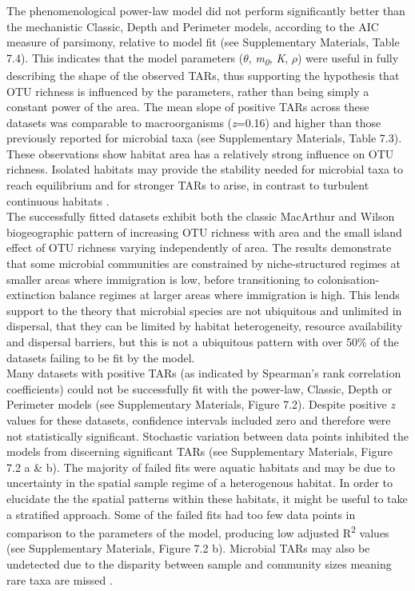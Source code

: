 \noindent The phenomenological power-law model did not perform significantly better than the mechanistic Classic, Depth and Perimeter models, according to the AIC measure of parsimony, relative to model fit (see Supplementary Materials, Table 7.4). This indicates that the model parameters ($\theta$, \textit{m\textsubscript{0}}, \textit{K}, $\rho$) were useful in fully describing the shape of the observed TARs, thus supporting the hypothesis that OTU richness is influenced by the parameters, rather than being simply a constant power of the area. The mean slope of positive TARs across these datasets was comparable to macroorganisms (\textit{z}=0.16) and higher than those previously reported for microbial taxa \cite{rosenzweig1995species} \cite{green2004spatial} (see Supplementary Materials, Table 7.3). These observations show habitat area has a relatively strong influence on OTU richness. Isolated habitats may provide the stability needed for microbial taxa to reach equilibrium and for stronger TARs to arise, in contrast to turbulent continuous habitats \cite{bell2005larger}.    \\

\noindent The successfully fitted datasets exhibit both the classic MacArthur and Wilson \cite{MacArthurRobertH1967Ttoi} biogeographic pattern of increasing OTU richness with area and the small island effect of OTU richness varying independently of area. The results demonstrate that some microbial communities are constrained by niche-structured regimes at smaller areas where immigration is low, before transitioning to colonisation-extinction balance regimes at larger areas where immigration is high. This lends support to the theory that microbial species are not ubiquitous and unlimited in dispersal, that they can be limited by habitat heterogeneity, resource availability and dispersal barriers, but this is not a ubiquitous pattern with over 50\% of the datasets failing to be fit by the model. \\

\noindent Many datasets with positive TARs (as indicated by Spearman's rank correlation coefficients) could not be successfully fit with the power-law, Classic, Depth or Perimeter models (see Supplementary Materials, Figure 7.2). Despite positive \textit{z} values for these datasets, confidence intervals included zero and therefore were not statistically significant. Stochastic variation between data points inhibited the models from discerning significant TARs (see Supplementary Materials, Figure 7.2 a \& b). The majority of failed fits were aquatic habitats and may be due to uncertainty in the spatial sample regime of a heterogenous habitat. In order to elucidate the the spatial patterns within these habitats, it might be useful to take a stratified approach. Some of the failed fits had too few data points in comparison to the parameters of the model, producing low adjusted R\textsuperscript{2} values (see Supplementary Materials, Figure 7.2 b). Microbial TARs may also be undetected due to the disparity between sample and community sizes meaning rare taxa are missed \cite{woodcock2006taxa}.\\ 

